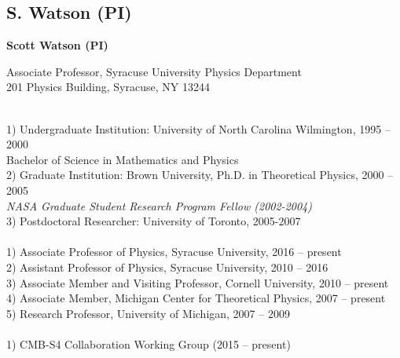 \documentclass[useAMS,12pt]{article}
\begin{document}
\subsection{S. Watson (PI)}
\begin{center}
{\bf{\large Scott Watson (PI)}}\smallskip

Associate Professor, Syracuse University Physics Department\\

201 Physics Building, Syracuse, NY 13244\smallskip
\end{center}

\bigskip
{}\\[-0.3cm]

1) Undergraduate Institution: University of North Carolina Wilmington, 1995 -- 2000 \\
Bachelor of Science in Mathematics and Physics\\[-0.3cm]

2) Graduate Institution: Brown University, Ph.D. in Theoretical Physics, 2000 -- 2005\\
{\em NASA Graduate Student Research Program Fellow (2002-2004)}\\[-0.3cm]

3) Postdoctoral Researcher: University of Toronto, 2005-2007\\

\bigskip
{}\\[-0.3cm]

1) Associate Professor of Physics, Syracuse University, 2016 -- present\\[-0.3cm]

2) Assistant Professor of Physics, Syracuse University, 2010 -- 2016\\[-0.3cm]

3) Associate Member and Visiting Professor, Cornell University, 2010 -- present\\[-0.3cm]

4) Associate Member, Michigan Center for Theoretical Physics, 2007 -- present\\[-0.3cm]

5) Research Professor, University of Michigan, 2007 -- 2009\\

\bigskip
{} \\[-0.3cm]

1) CMB-S4 Collaboration Working Group (2015 -- present)\\[-0.3cm]
\end{document}
